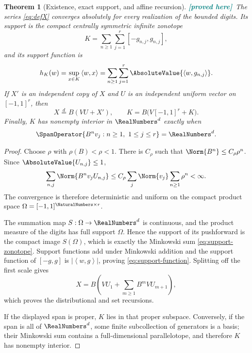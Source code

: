 \documentclass[11pt,oneside]{article}
\newtheorem{theorem}{Theorem}[section]
\theoremstyle{definition}
\theoremstyle{remark}
\newcommand{\ip}[2]{\left\langle #1,#2\right\rangle}
\newcommand{\New}{\textcolor{teal}{\textbf{[proved here]}}}
\begin{document}
\begin{theorem}[Existence, exact support, and affine recursion]
\label{thm:existence-support}
\New\ The series \eqref{eq:defX} converges absolutely for every realization of
the bounded digits.  Its support is the compact centrally symmetric infinite
zonotope
\begin{equation}
 K=\sum_{n\ge1}\sum_{j=1}^r[-g_{n,j},g_{n,j}],
 \label{eq:support-zonotope}
\end{equation}
and its support function is
\begin{equation}
 h_K(w)=\sup_{x\in K}\ip{w}{x}
       =\sum_{n\ge1}\sum_{j=1}^r\AbsoluteValue{\ip{w}{g_{n,j}}}.
 \label{eq:support-function}
\end{equation}
If $X'$ is an independent copy of $X$ and $U$ is an independent uniform vector
on $[-1,1]^r$, then
\begin{equation}
 X\overset d=B(VU+X'),
 \qquad
 K=B\bigl(V[-1,1]^r+K\bigr).
 \label{eq:affine-recursion}
\end{equation}
Finally, $K$ has nonempty interior in $\RealNumbers^d$ exactly when
\begin{equation}
 \SpanOperator\{B^nv_j:n\ge1,\ 1\le j\le r\}=\RealNumbers^d.
 \label{eq:span-condition}
\end{equation}
\end{theorem}

\begin{proof}
Choose $\rho$ with $\rho(B)<\rho<1$.  There is $C_\rho$ such that
$\Norm{B^n}\le C_\rho\rho^n$.  Since
$\AbsoluteValue{U_{n,j}}\le1$,
\[
 \sum_{n,j}\Norm{B^nv_jU_{n,j}}
 \le C_\rho\sum_j\Norm{v_j}\sum_{n\ge1}\rho^n<\infty.
\]
The convergence is therefore deterministic and uniform on the compact product
space $\Omega=[-1,1]^{\NaturalNumbers\times r}$.

The summation map $S:\Omega\to\RealNumbers^d$ is continuous, and the product measure of
the digits has full support $\Omega$.  Hence the support of its pushforward is
the compact image $S(\Omega)$, which is exactly the Minkowski sum
\eqref{eq:support-zonotope}.  Support functions add under Minkowski addition and
the support function of $[-g,g]$ is $|\ip{w}{g}|$, proving
\eqref{eq:support-function}.  Splitting off the first scale gives
\[
 X=B\left(VU_1+\sum_{m\ge1}B^mVU_{m+1}\right),
\]
which proves the distributional and set recursions.

If the displayed span is proper, $K$ lies in that proper subspace.  Conversely,
if the span is all of $\RealNumbers^d$, some finite subcollection of generators is a basis;
their Minkowski sum contains a full-dimensional parallelotope, and therefore
$K$ has nonempty interior.
\end{proof}
\end{document}
